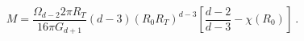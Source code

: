 \begin{equation}
\label{neutmass}
M = \frac{\Omega_{d-2} 2\pi R_T}{16 \pi G_{d+1}}
(d-3) (R_0 R_T)^{d-3} \left[ \frac{d-2}{d-3} - \chi(R_0) \right] \ .
\end{equation}

